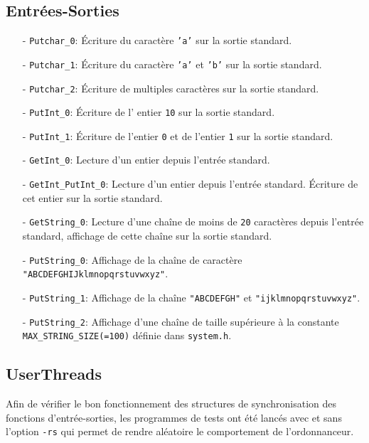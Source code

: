 \documentclass[11pt]{article}
\theoremstyle{definition}
\theoremstyle{definition}
\begin{document}
\subsection{Entrées-Sorties}
\begin{itemize}
\item[-] \texttt{Putchar\_0}: Écriture du caractère \texttt{'a'} sur la sortie standard.
\item[-] \texttt{Putchar\_1}: Écriture du caractère \texttt{'a'} et \texttt{'b'} sur la sortie standard.
\item[-] \texttt{Putchar\_2}: Écriture de multiples caractères sur la sortie standard.
\item[-] \texttt{PutInt\_0}: Écriture de l' entier \texttt{10} sur la sortie standard.
\item[-] \texttt{PutInt\_1}: Écriture de l'entier \texttt{0} et de l'entier \texttt{1} sur la sortie standard.
\item[-] \texttt{GetInt\_0}: Lecture d'un entier depuis l'entrée standard.
\item[-] \texttt{GetInt\_PutInt\_0}:
  Lecture d'un entier depuis l'entrée standard.
  Écriture de cet entier sur la sortie standard.
\item[-] \texttt{GetString\_0}: Lecture d'une chaîne de moins de \texttt{20} caractères depuis l'entrée standard, affichage de cette chaîne sur la sortie standard.
\item[-] \texttt{PutString\_0}: Affichage de la chaîne de caractère \texttt{"ABCDEFGHIJklmnopqrstuvwxyz"}.
\item[-] \texttt{PutString\_1}: Affichage de la chaîne \texttt{"ABCDEFGH"} et \texttt{"ijklmnopqrstuvwxyz"}.
\item[-] \texttt{PutString\_2}:   Affichage d'une chaîne de taille supérieure à la
  constante \texttt{MAX\_STRING\_SIZE(=100)} définie dans \texttt{system.h}.
\end{itemize}

\subsection{UserThreads}
Afin de vérifier le bon fonctionnement des structures de synchronisation des fonctions d'entrée-sorties,
les programmes de tests ont été lancés avec et sans l'option \texttt{-rs} qui permet de rendre aléatoire le comportement de l'ordonnanceur.
\end{document}
